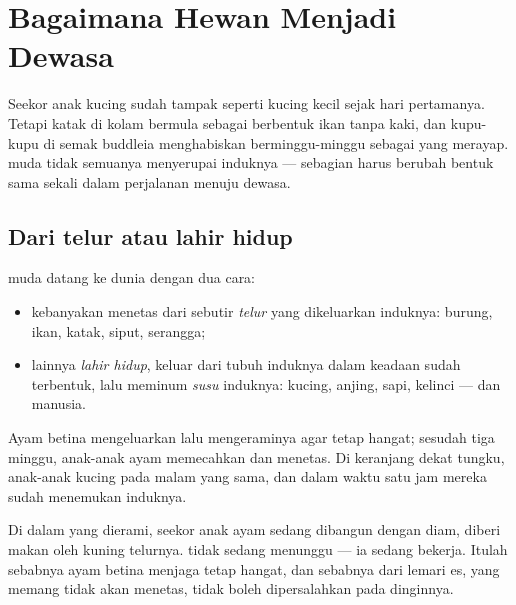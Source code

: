 \chapter{Bagaimana Hewan Menjadi Dewasa}\label{ch:g2:animals-grow-up}

Seekor anak kucing sudah tampak seperti kucing kecil sejak hari
pertamanya. Tetapi katak di kolam bermula sebagai  berbentuk
ikan tanpa kaki, dan kupu-kupu di semak buddleia menghabiskan
berminggu-minggu sebagai  yang merayap.  muda tidak semuanya
menyerupai induknya --- sebagian harus berubah bentuk sama sekali
dalam perjalanan menuju dewasa.

\section{Dari telur atau lahir hidup}

\begin{definition}\label{def:g2:animals-grow-up:born}
 muda datang ke dunia dengan dua cara:
\begin{itemize}
  \item kebanyakan menetas dari sebutir \emph{telur} yang
        dikeluarkan induknya: burung, ikan, katak, siput, serangga;
  \item lainnya \emph{lahir hidup}, keluar dari
        tubuh induknya dalam keadaan sudah terbentuk, lalu meminum
        \emph{susu} induknya: kucing, anjing, sapi,
        kelinci --- dan manusia.
\end{itemize}
\end{definition}

\begin{example}\label{ex:g2:animals-grow-up:henhouse}
Ayam betina mengeluarkan  lalu mengeraminya agar tetap hangat;
sesudah tiga minggu, anak-anak ayam memecahkan  dan menetas.
Di keranjang dekat tungku, anak-anak kucing  pada malam
yang sama, dan dalam waktu satu jam mereka sudah menemukan 
induknya.
\end{example}

\begin{remark}\label{rem:g2:animals-grow-up:egg}
Di dalam  yang dierami, seekor anak ayam sedang dibangun dengan
diam, diberi makan oleh kuning telurnya.  tidak sedang
menunggu --- ia sedang bekerja. Itulah sebabnya ayam betina menjaga
 tetap hangat, dan sebabnya  dari lemari es, yang memang
tidak akan menetas, tidak boleh dipersalahkan pada dinginnya.
\end{remark}

